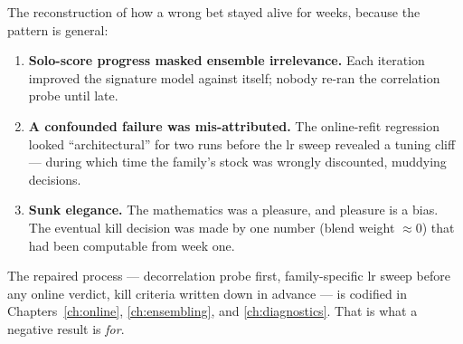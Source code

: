 The reconstruction of how a wrong bet stayed alive for weeks, because the
pattern is general:

\begin{enumerate}
\item \textbf{Solo-score progress masked ensemble irrelevance.} Each
  iteration improved the signature model against itself; nobody re-ran the
  correlation probe until late.
\item \textbf{A confounded failure was mis-attributed.} The online-refit
  regression looked ``architectural'' for two runs before the lr sweep
  revealed a tuning cliff --- during which time the family's stock was
  wrongly discounted, muddying decisions.
\item \textbf{Sunk elegance.} The mathematics was a pleasure, and pleasure
  is a bias. The eventual kill decision was made by one number (blend
  weight $\approx 0$) that had been computable from week one.
\end{enumerate}

The repaired process --- decorrelation probe first, family-specific lr
sweep before any online verdict, kill criteria written down in advance ---
is codified in Chapters~\ref{ch:online}, \ref{ch:ensembling}, and
\ref{ch:diagnostics}. That is what a negative result is \emph{for}.
